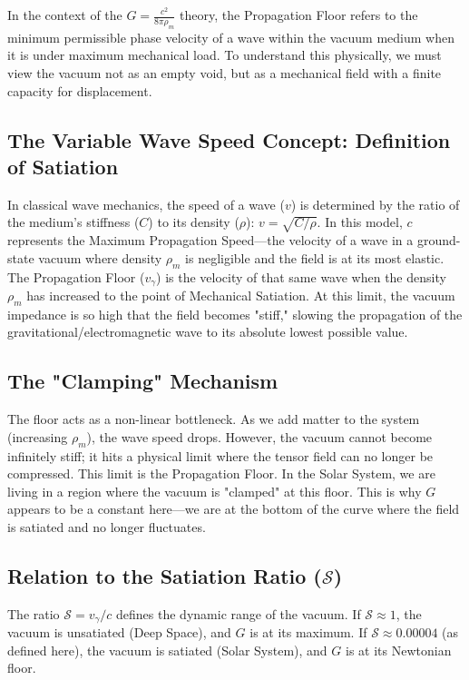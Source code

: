 \documentclass[12pt,a4paper]{article}
\begin{document}
In the context of the $G = \frac{c^2}{8\pi\rho_m}$ theory, the Propagation Floor refers to the minimum permissible phase velocity of a wave within the vacuum medium when it is under maximum mechanical load. To understand this physically, we must view the vacuum not as an empty void, but as a mechanical field with a finite capacity for displacement. 

\subsection{The Variable Wave Speed Concept: Definition of Satiation}
In classical wave mechanics, the speed of a wave ($v$) is determined by the ratio of the medium's stiffness ($C$) to its density ($\rho$): $v = \sqrt{C/\rho}$. In this model, $c$ represents the Maximum Propagation Speed—the velocity of a wave in a ground-state vacuum where density $\rho_m$ is negligible and the field is at its most elastic. The Propagation Floor ($v_\gamma$) is the velocity of that same wave when the density $\rho_m$ has increased to the point of Mechanical Satiation. At this limit, the vacuum impedance is so high that the field becomes "stiff," slowing the propagation of the gravitational/electromagnetic wave to its absolute lowest possible value.

\subsection{The "Clamping" Mechanism}
The floor acts as a non-linear bottleneck. As we add matter to the system (increasing $\rho_m$), the wave speed drops. However, the vacuum cannot become infinitely stiff; it hits a physical limit where the tensor field can no longer be compressed. This limit is the Propagation Floor. In the Solar System, we are living in a region where the vacuum is "clamped" at this floor. This is why $G$ appears to be a constant here—we are at the bottom of the curve where the field is satiated and no longer fluctuates.

\subsection{Relation to the Satiation Ratio ($\mathcal{S}$)}
The ratio $\mathcal{S} = v_\gamma / c$ defines the dynamic range of the vacuum. If $\mathcal{S} \approx 1$, the vacuum is unsatiated (Deep Space), and $G$ is at its maximum. If $\mathcal{S} \approx 0.00004$ (as defined here), the vacuum is satiated (Solar System), and $G$ is at its Newtonian floor.
\end{document}
